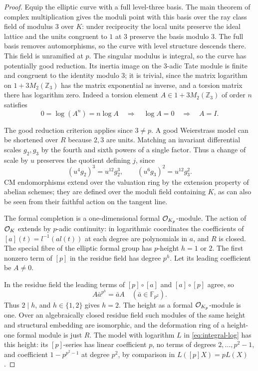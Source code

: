 \begin{proof}

Equip the elliptic curve with a
full level-three basis. The main theorem of complex multiplication
gives the moduli point with this basis over the ray class field
of modulus \(3\) over \(K\): under reciprocity the local units
preserve the ideal lattice and the units congruent to \(1\) at
\(3\) preserve the basis modulo \(3\). The full basis removes
automorphisms, so the curve with level structure descends there.
This field is unramified at \(p\). The singular modulus is
integral, so the curve has potentially good reduction. Its
inertia image on the \(3\)-adic Tate module is finite and
congruent to the identity modulo \(3\); it is trivial, since
the matrix logarithm on \(1+3M_2(\mathbb Z_3)\) has the
matrix exponential as inverse, and a torsion matrix there
has logarithm zero.
Indeed a torsion element \(A\in1+3M_2(\mathbb Z_3)\) of order \(n\) satisfies
\[
  0=\log(A^n)=n\log A\quad\Longrightarrow\quad \log A=0\quad\Longrightarrow\quad A=I .
\]

The good reduction criterion applies
since \(3\ne p\). A good Weierstrass model can be shortened
over \(R\) because \(2,3\) are units. Matching an invariant
differential scales \(g_2,g_3\) by the fourth and sixth
powers of a single factor.
Thus a change of scale by \(u\) preserves the quotient defining \(j\), since
\[
  (u^4g_2)^3=u^{12}g_2^3,\qquad (u^6g_3)^2=u^{12}g_3^2.
\]
 CM endomorphisms extend over the
valuation ring by the extension property of abelian schemes;
they are defined over the moduli field containing \(K\),
as can also be seen from their faithful action on the tangent
line. \cite{cm-reciprocity,serre-tate}


The formal completion is a one-dimensional formal
\({\cal O}_{K_p}\)-module. The action of \({\cal O}_K\) extends
by \(p\)-adic continuity: in logarithmic coordinates the
coefficients of \([a](t)=l^{-1}(a l(t))\) at each degree are
polynomials in \(a\), and \(R\) is closed. The special fibre
of the elliptic formal group has \(p\)-height \(h=1\) or \(2\).
The first nonzero term of \([p]\) in the residue field has
degree \(p^h\). Let its leading coefficient be \(A\ne0\).

In the residue
field the leading terms of \([p]\circ[a]\) and
\([a]\circ[p]\) agree, so
\[
                    A\bar a^{p^h}= \bar a A
                            \quad(\bar a\in\mathbb F_{p^2}).
\]
Thus \(2\mid h\), and \(h\in\{1,2\}\) gives \(h=2\). The height as
a formal \({\cal O}_{K_p}\)-module is one. Over an algebraically
closed residue field such modules of the same height and
structural embedding are isomorphic, and the deformation ring
of a height-one formal module is just \(R\). The model with
logarithm \(L\) in \eqref{eq:integral-log} has this height:
its \([p]\)-series has linear coefficient \(p\), no terms of
degrees \(2,\ldots,p^2-1\), and coefficient \(1-p^{p^2-1}\)
at degree \(p^2\), by comparison in \(L([p]X)=pL(X)\).


\end{proof}
